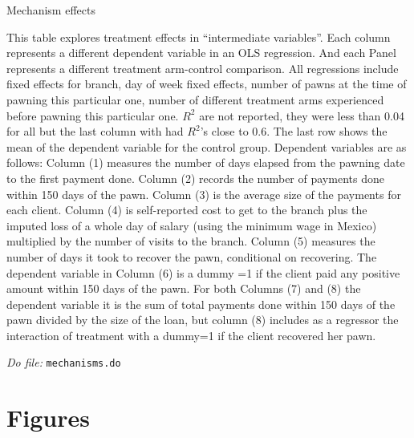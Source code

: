 \documentclass[11pt]{article}
\begin{document}
\begin{table}[H]
\caption{Mechanism effects}
\label{mechanisms}
\begin{center}
\scriptsize{}
\end{center}
 \scriptsize
This table explores treatment effects in ``intermediate variables''. Each column represents a different dependent variable in an OLS regression. And each Panel represents a different treatment arm-control comparison. All regressions include fixed effects for branch, day of week fixed effects, number of pawns at the time of pawning this particular one, number of different treatment arms experienced before pawning this particular one. $R^2$ are not reported, they were less than 0.04 for all but the last column with had $R^2$'s close to 0.6. The last row shows the mean of the dependent variable for the control group. Dependent variables are as follows: Column (1) measures the number of days elapsed from the pawning date to the first payment done. Column (2) records the number of payments done within 150 days of the pawn. Column (3) is the average size of the payments for each client. Column (4) is self-reported cost to get to the branch plus the imputed loss of a whole day of salary (using the minimum wage in Mexico) multiplied by the number of visits to the branch. Column (5) measures the number of days it took to recover the pawn, conditional on recovering. The dependent variable in Column (6) is a dummy =1 if the client paid any positive amount within 150 days of the pawn. For both Columns (7) and (8) the dependent variable it is the sum of total payments done within 150 days of the pawn divided by the size of the loan, but column (8) includes as a regressor the interaction of treatment with a dummy=1 if the client recovered her pawn.

\textit{Do file: } \texttt{mechanisms.do}
\end{table}


\section{Figures}
\end{document}
